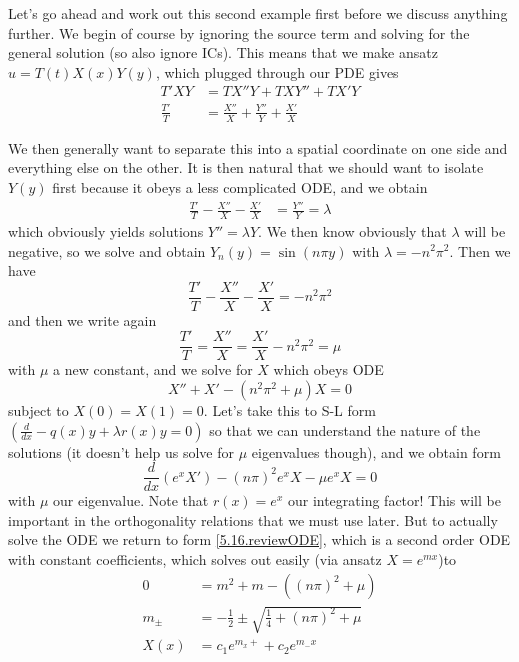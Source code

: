 \documentclass[10pt]{article}
\newcommand{\rd}[2]{\frac{d#1}{d#2}}
\begin{document}
Let's go ahead and work out this second example first before we discuss anything further. We begin of course by ignoring the source term and solving for the general solution (so also ignore ICs). This means that we make ansatz $u = T(t)X(x)Y(y)$, which plugged through our PDE gives
\begin{align}
    T'XY &= TX''Y + TXY'' + TX'Y\\
    \frac{T'}{T} &= \frac{X''}{X} + \frac{Y''}{Y} + \frac{X'}{X}
\end{align}

We then generally want to separate this into a spatial coordinate on one side and everything else on the other. It is then natural that we should want to isolate $Y(y)$ first because it obeys a less complicated ODE, and we obtain
\begin{align}
    \frac{T'}{T} - \frac{X''}{X} - \frac{X'}{X} &= \frac{Y''}{Y} = \lambda
\end{align}
which obviously yields solutions $Y'' = \lambda Y$. We then know obviously that $\lambda$ will be negative, so we solve and obtain $Y_n(y) = \sin(n\pi y)$ with $\lambda = -n^2\pi^2$. Then we have
\begin{equation}
    \frac{T'}{T} - \frac{X''}{X} - \frac{X'}{X} = -n^2\pi^2
\end{equation}
and then we write again
\begin{equation}
    \frac{T'}{T} = \frac{X''}{X} = \frac{X'}{X}  -n^2\pi^2 = \mu
\end{equation}
with $\mu$ a new constant, and we solve for $X$ which obeys ODE
\begin{equation}
    X'' + X' - (n^2\pi^2 + \mu)X = 0\label{5.16.reviewODE}
\end{equation}
subject to $X(0) = X(1) = 0$. Let's take this to S-L form $\left(\rd{}{x} - q(x)y + \lambda r(x)y = 0\right)$ so that we can understand the nature of the solutions (it doesn't help us solve for $\mu$ eigenvalues though), and we obtain form
\begin{equation}
    \rd{}{x}\left( e^xX' \right) - (n\pi)^2e^xX - \mu e^xX = 0
\end{equation}
with $\mu$ our eigenvalue. Note that $r(x) = e^x$ our integrating factor! This will be important in the orthogonality relations that we must use later. But to actually solve the ODE we return to form \eqref{5.16.reviewODE}, which is a second order ODE with constant coefficients, which solves out easily (via ansatz $X = e^{mx}$)to
\begin{align}
    0 &= m^2 + m - \left( (n\pi)^2 + \mu \right)\\
    m_\pm &= -\frac{1}{2} \pm \sqrt{\frac{1}{4} + (n\pi)^2 + \mu}\\
    X(x) &= c_1e^{m_x+} + c_2e^{m_-x}
\end{align}
\end{document}
